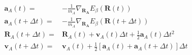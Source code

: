 \documentclass{article}
\renewcommand{\vec}[1]{\ensuremath{\mathbf{#1}}}
\begin{document}
\begin{align}
  \vec{a}_A(t)=&
  -\frac{1}{m_A}\nabla_{\vec{R_A}}E_\beta(\vec{R}(t))\nonumber\\
  \vec{a}_A(t+\Delta t)=&
  -\frac{1}{m_A}\nabla_{\vec{R_A}}E_\beta(\vec{R}(t+\Delta t))\nonumber\\
  \vec{R}_A(t+\Delta t)=&
  \vec{R}_A(t)+\vec{v}_A(t)\Delta t + \frac{1}{2}\vec{a}_A(t)\Delta t^2\nonumber\\
  \vec{v}_A(t+\Delta t)=&
  \vec{v}_A(t)+\frac{1}{2}\left[\vec{a}_A(t)+\vec{a}_A(t+\Delta t)\right]\Delta t
\nonumber\end{align}
\end{document}

